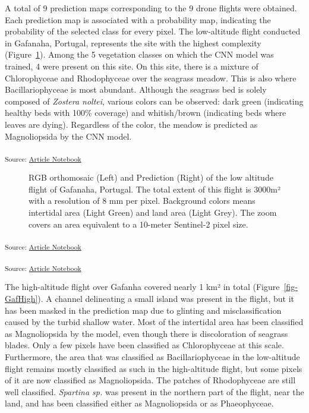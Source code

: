 \documentclass[
  number]{elsarticle}
\begin{document}
A total of 9 prediction maps corresponding to the 9 drone flights were
obtained. Each prediction map is associated with a probability map,
indicating the probability of the selected class for every pixel. The
low-altitude flight conducted in Gafanaha, Portugal, represents the site
with the highest complexity (Figure~\ref{fig-GafLow}). Among the 5
vegetation classes on which the CNN model was trained, 4 were present on
this site. On this site, there is a mixture of Chlorophyceae and
Rhodophyceae over the seagrass meadow. This is also where
Bacillariophyceae is most abundant. Although the seagrass bed is solely
composed of \emph{Zostera noltei}, various colors can be observed: dark
green (indicating healthy beds with 100\% coverage) and whitish/brown
(indicating beds where leaves are dying). Regardless of the color, the
meadow is predicted as Magnoliopsida by the CNN model.

\textsubscript{Source:
\href{https://SigOiry.github.io/Drone_Paper_2023/index.qmd.html}{Article
Notebook}}

\label{cell-fig-GafLow}
\begin{figure}[H]


\caption{\label{fig-GafLow}RGB orthomosaic (Left) and Prediction (Right)
of the low altitude flight of Gafanaha, Portugal. The total extent of
this flight is 3000m² with a resolution of 8 mm per pixel. Background
colors means intertidal area (Light Green) and land area (Light Grey).
The zoom covers an area equivalent to a 10-meter Sentinel-2 pixel size.}

\end{figure}%

\textsubscript{Source:
\href{https://SigOiry.github.io/Drone_Paper_2023/index.qmd.html}{Article
Notebook}}

\textsubscript{Source:
\href{https://SigOiry.github.io/Drone_Paper_2023/index.qmd.html}{Article
Notebook}}

The high-altitude flight over Gafanha covered nearly 1 km² in total
(Figure~\ref{fig-GafHigh}). A channel delineating a small island was
present in the flight, but it has been masked in the prediction map due
to glinting and misclassification caused by the turbid shallow water.
Most of the intertidal area has been classified as Magnoliopsida by the
model, even though there is discoloration of seagrass blades. Only a few
pixels have been classified as Chlorophyceae at this scale. Furthermore,
the area that was classified as Bacillariophyceae in the low-altitude
flight remains mostly classified as such in the high-altitude flight,
but some pixels of it are now classified as Magnoliopsida. The patches
of Rhodophyceae are still well classified. \emph{Spartina sp.} was
present in the northern part of the flight, near the land, and has been
classified either as Magnoliopsida or as Phaeophyceae.
\end{document}
